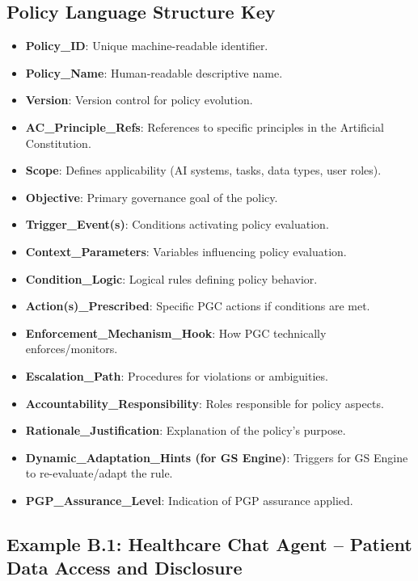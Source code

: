 \documentclass[sigconf,review,anonymous=false]{acmart} %
\begin{document}
\subsection{Policy Language Structure Key}
\label{app:policy_examples_structure}
\begin{itemize}
    \item \textbf{Policy\_ID}: Unique machine-readable identifier.
    \item \textbf{Policy\_Name}: Human-readable descriptive name.
    \item \textbf{Version}: Version control for policy evolution.
    \item \textbf{AC\_Principle\_Refs}: References to specific principles in the Artificial Constitution.
    \item \textbf{Scope}: Defines applicability (AI systems, tasks, data types, user roles).
    \item \textbf{Objective}: Primary governance goal of the policy.
    \item \textbf{Trigger\_Event(s)}: Conditions activating policy evaluation.
    \item \textbf{Context\_Parameters}: Variables influencing policy evaluation.
    \item \textbf{Condition\_Logic}: Logical rules defining policy behavior.
    \item \textbf{Action(s)\_Prescribed}: Specific PGC actions if conditions are met.
    \item \textbf{Enforcement\_Mechanism\_Hook}: How PGC technically enforces/monitors.
    \item \textbf{Escalation\_Path}: Procedures for violations or ambiguities.
    \item \textbf{Accountability\_Responsibility}: Roles responsible for policy aspects.
    \item \textbf{Rationale\_Justification}: Explanation of the policy's purpose.
    \item \textbf{Dynamic\_Adaptation\_Hints (for GS Engine)}: Triggers for GS Engine to re-evaluate/adapt the rule.
    \item \textbf{PGP\_Assurance\_Level}: Indication of PGP assurance applied.
\end{itemize}

\subsection{Example B.1: Healthcare Chat Agent – Patient Data Access and Disclosure}
\label{app:policy_example_healthcare}
\end{document}
